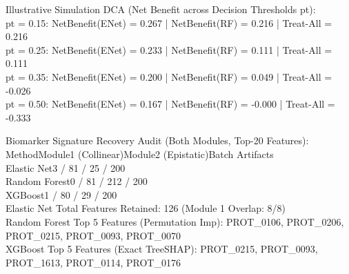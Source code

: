\documentclass[11pt,oneside]{book}
\begin{document}
\begin{routput}
Illustrative Simulation DCA (Net Benefit across Decision Thresholds pt):\\
\hspace*{2em}pt = 0.15: NetBenefit(ENet) = 0.267 | NetBenefit(RF) = 0.216 | Treat-All = 0.216\\
\hspace*{2em}pt = 0.25: NetBenefit(ENet) = 0.233 | NetBenefit(RF) = 0.111 | Treat-All = 0.111\\
\hspace*{2em}pt = 0.35: NetBenefit(ENet) = 0.200 | NetBenefit(RF) = 0.049 | Treat-All = -0.026\\
\hspace*{2em}pt = 0.50: NetBenefit(ENet) = 0.167 | NetBenefit(RF) = -0.000 | Treat-All = -0.333

Biomarker Signature Recovery Audit (Both Modules, Top-20 Features):\\
\hspace*{2em}Method\hspace*{4.5em}Module1 (Collinear)\hspace*{2em}Module2 (Epistatic)\hspace*{2em}Batch Artifacts\\
\hspace*{2em}Elastic Net\hspace*{2.8em}3 / 8\hspace*{7.2em}1 / 2\hspace*{7.2em}5 / 200\\
\hspace*{2em}Random Forest\hspace*{2.0em}0 / 8\hspace*{7.2em}1 / 2\hspace*{7.2em}12 / 200\\
\hspace*{2em}XGBoost\hspace*{3.8em}1 / 8\hspace*{7.2em}0 / 2\hspace*{7.2em}9 / 200\\
\hspace*{2em}Elastic Net Total Features Retained: 126 (Module 1 Overlap: 8/8)\\
\hspace*{2em}Random Forest Top 5 Features (Permutation Imp): PROT\_0106, PROT\_0206, PROT\_0215, PROT\_0093, PROT\_0070\\
\hspace*{2em}XGBoost Top 5 Features (Exact TreeSHAP):        PROT\_0215, PROT\_0093, PROT\_1613, PROT\_0114, PROT\_0176
\end{routput}
\end{document}
